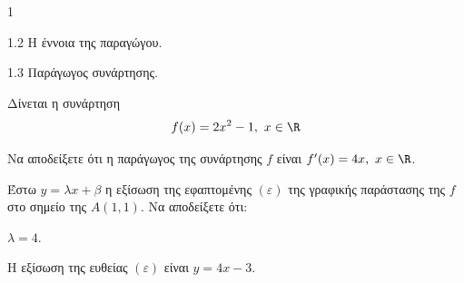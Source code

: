 \begin{ylh}{1}
    \item 1.2 Η έννοια της παραγώγου.
    \item 1.3 Παράγωγος συνάρτησης.
\end{ylh}
Δίνεται η συνάρτηση
\[ f(x) = 2x^2 - 1, \ x \in \R \]
\begin{alist}
    \item Να αποδείξετε ότι η παράγωγος της συνάρτησης $f$ είναι $f'(x) = 4x, \ x \in \R$.
\end{alist}
Έστω $y = \lambda x + \beta$ η εξίσωση της εφαπτομένης $(\varepsilon)$ της γραφικής παράστασης της $f$ στο σημείο της $A(1,1)$. Να αποδείξετε ότι:
\begin{alist}[resume]
    \item $\lambda = 4$.
    \item Η εξίσωση της ευθείας $(\varepsilon)$ είναι $y = 4x - 3$.
\end{alist}

